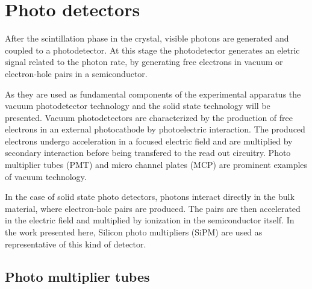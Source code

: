 
\chapter{Photo detectors}
After the scintillation phase in the crystal, visible photons are generated and coupled to a photodetector. At this stage the photodetector generates an eletric signal related to the photon rate, by generating free electrons in vacuum or electron-hole pairs in a semiconductor.

As they are used as fundamental components of the experimental apparatus the vacuum photodetector technology and the solid state technology will be presented.
Vacuum photodetectors are characterized by the production of free electrons in an external photocathode by photoelectric interaction. The produced electrons undergo acceleration in a focused electric field and are multiplied by secondary interaction before being transfered to the read out circuitry. Photo multiplier tubes (PMT) and micro channel plates (MCP) are prominent examples of vacuum technology.
  
In the case of solid state photo detectors, photons interact directly in the bulk material, where electron-hole pairs are produced. The pairs are then accelerated in the electric field and multiplied by ionization in the semiconductor itself. In the work presented here, Silicon photo multipliers (SiPM) are used as representative of this kind of detector.     

\section{Photo multiplier tubes}


